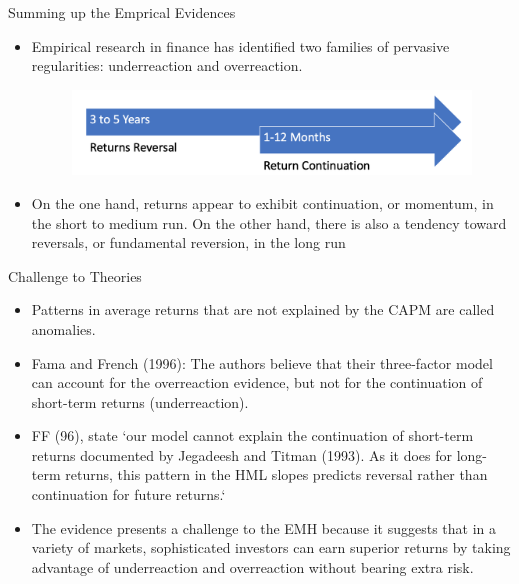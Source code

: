 \documentclass{beamer}
\begin{document}
\begin{frame}{Summing up the Emprical Evidences}
    \begin{itemize}
        \item Empirical research in ﬁnance has identiﬁed two families of pervasive regularities: underreaction and overreaction.
              \begin{figure}
                  \centering
                  \includegraphics[scale=.4]{sumup.png}
              \end{figure}
        \item On the one hand, returns appear to exhibit continuation, or momentum, in the short to medium run. On the other hand, there is also a tendency toward reversals, or fundamental reversion, in the long run
    \end{itemize}
\end{frame}

\begin{frame}{Challenge to Theories}
    \begin{itemize}
        \item Patterns in average returns that are not explained by the CAPM are called anomalies.
        \item Fama and French (1996): The authors believe that their three-factor model can account for the overreaction evidence, but not for the continuation of short-term returns (underreaction).
        \item FF (96), state ‍‍‍‍`our model cannot explain the continuation of short-term returns documented by Jegadeesh and Titman (1993). As it does for long-term returns, this pattern in the HML slopes predicts reversal rather than continuation for future returns.`
        \item The evidence presents a challenge to the EMH because it suggests that in a variety of markets, sophisticated investors can earn superior returns by taking advantage of underreaction and overreaction without bearing extra risk.
    \end{itemize}
\end{frame}
\end{document}
